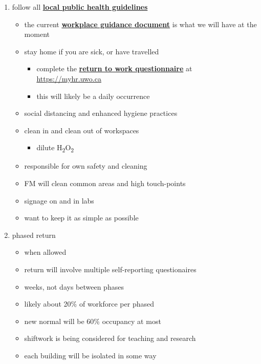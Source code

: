 \documentclass[onecolumn]{article}
\providecommand{\tightlist}{%
  \setlength{\itemsep}{0pt}\setlength{\parskip}{0pt}}
\begin{document}
\begin{enumerate}
\def\labelenumi{\arabic{enumi}.}
\item
  follow all
  \textbf{\href{https://www.healthunit.com/covid-19-prevent-the-spread}{local
  public health guidelines}}

  \begin{itemize}
  \item
    the current
    \textbf{\href{http://www.health.gov.on.ca/en/pro/programs/publichealth/coronavirus/docs/2019_essential_workplaces_guidance.pdf}{workplace
    guidance document}} is what we will have at the moment
  \item
    stay home if you are sick, or have travelled

    \begin{itemize}
    \item
      complete the \textbf{\href{https://myhr.uwo.ca}{return to work
      questionnaire}} at \url{https://myhr.uwo.ca}
    \item
      this will likely be a daily occurrence
    \end{itemize}
  \item
    social distancing and enhanced hygiene practices
  \item
    clean in and clean out of workspaces

    \begin{itemize}
    \tightlist
    \item
      dilute H\textsubscript{2}O\textsubscript{2}
    \end{itemize}
  \item
    responsible for own safety and cleaning
  \item
    FM will clean common areas and high touch-points
  \item
    signage on and in labs
  \item
    want to keep it as simple as possible
  \end{itemize}
\item
  phased return

  \begin{itemize}
  \item
    when allowed
  \item
    return will involve multiple self-reporting questionaires
  \item
    weeks, not days between phases
  \item
    likely about 20\% of workforce per phased
  \item
    new normal will be 60\% occupancy at most
  \item
    shiftwork is being considered for teaching and research
  \item
    each building will be isolated in some way


\end{itemize}
\end{enumerate}
\end{document}
